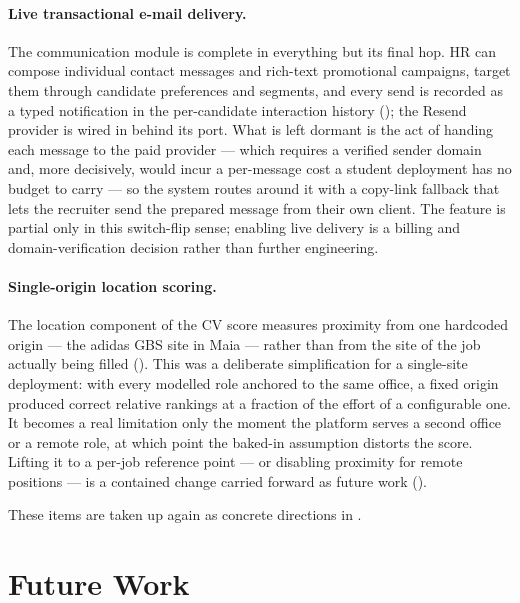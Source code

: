 \paragraph{Live transactional e-mail delivery.}
The communication module is complete in everything but its final hop. HR can
compose individual contact messages and rich-text promotional campaigns,
target them through candidate preferences and segments, and every send is
recorded as a typed notification in the per-candidate interaction history
(); the Resend provider is wired in behind its
port. What is left dormant is the act of handing each message to the paid
provider --- which requires a verified sender domain and, more decisively,
would incur a per-message cost a student deployment has no budget to carry ---
so the system routes around it with a copy-link fallback that lets the
recruiter send the prepared message from their own client. The feature is
partial only in this switch-flip sense; enabling live delivery is a billing
and domain-verification decision rather than further engineering.

\paragraph{Single-origin location scoring.}
The location component of the CV score measures proximity from one hardcoded
origin --- the adidas GBS site in Maia --- rather than from the site of the job
actually being filled (). This was a deliberate
simplification for a single-site deployment: with every modelled role anchored
to the same office, a fixed origin produced correct relative rankings at a
fraction of the effort of a configurable one. It becomes a real limitation
only the moment the platform serves a second office or a remote role, at which
point the baked-in assumption distorts the score. Lifting it to a per-job
reference point --- or disabling proximity for remote positions --- is a
contained change carried forward as future work ().

These items are taken up again as concrete directions in
.


\section{Future Work}
\label{sec:concl-future}

